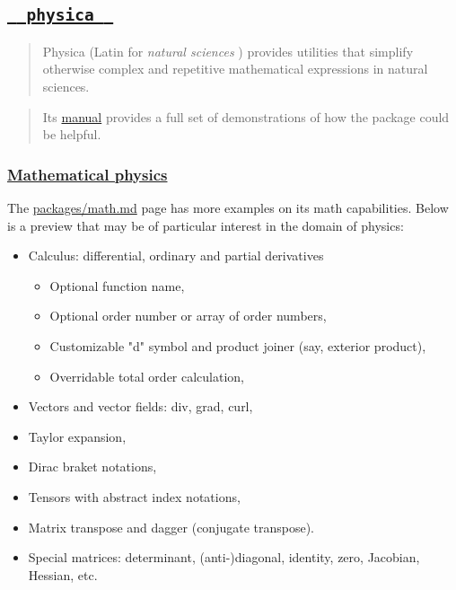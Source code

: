 \subsection{\texorpdfstring{\hyperref[physica]{\texttt{\ }{\texttt{\ physica\ }}\texttt{\ }}}{  physica  }}\label{physica}

\begin{quote}
Physica (Latin for \emph{natural sciences} ) provides utilities that
simplify otherwise complex and repetitive mathematical expressions in
natural sciences.
\end{quote}

\begin{quote}
Its
\href{https://github.com/Leedehai/typst-physics/blob/master/physica-manual.pdf}{manual}
provides a full set of demonstrations of how the package could be
helpful.
\end{quote}

\subsubsection{\texorpdfstring{\hyperref[mathematical-physics]{Mathematical
physics}}{Mathematical physics}}\label{mathematical-physics}

The \href{./math.html\#common-notations}{packages/math.md} page has more
examples on its math capabilities. Below is a preview that may be of
particular interest in the domain of physics:

\begin{itemize}
\tightlist
\item
  Calculus: differential, ordinary and partial derivatives

  \begin{itemize}
  \tightlist
  \item
    Optional function name,
  \item
    Optional order number or array of order numbers,
  \item
    Customizable "d" symbol and product joiner (say, exterior product),
  \item
    Overridable total order calculation,
  \end{itemize}
\item
  Vectors and vector fields: div, grad, curl,
\item
  Taylor expansion,
\item
  Dirac braket notations,
\item
  Tensors with abstract index notations,
\item
  Matrix transpose and dagger (conjugate transpose).
\item
  Special matrices: determinant, (anti-)diagonal, identity, zero,
  Jacobian, Hessian, etc.
\end{itemize}

